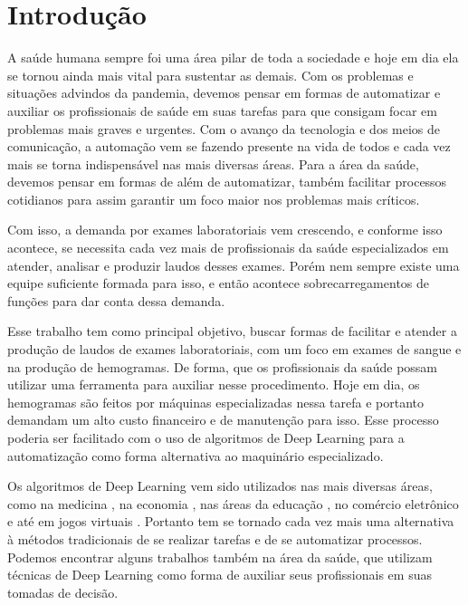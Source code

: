 \chapter{Introdução}
\label{chap:introducao}

A saúde humana sempre foi uma área pilar de toda a sociedade e hoje em dia ela se tornou ainda mais vital para sustentar as demais. Com os problemas e situações advindos da pandemia, devemos pensar em formas de automatizar e auxiliar os profissionais de saúde em suas tarefas para que consigam focar em problemas mais graves e urgentes. Com o avanço da tecnologia e dos meios de comunicação, a automação vem se fazendo presente na vida de todos e cada vez mais se torna indispensável nas mais diversas áreas. Para a área da saúde, devemos pensar em formas de além de automatizar, também facilitar processos cotidianos para assim garantir um foco maior nos problemas mais críticos.

Com isso, a demanda por exames laboratoriais vem crescendo, e conforme isso acontece, se necessita cada vez mais de profissionais da saúde especializados em atender, analisar e produzir laudos desses exames. Porém nem sempre existe uma equipe suficiente formada para isso, e então acontece sobrecarregamentos de funções para dar conta dessa demanda.

Esse trabalho tem como principal objetivo, buscar formas de facilitar e atender a produção de laudos de exames laboratoriais, com um foco em exames de sangue e na produção de hemogramas. De forma, que os profissionais da saúde possam utilizar uma ferramenta para auxiliar nesse procedimento. Hoje em dia, os hemogramas são feitos por máquinas especializadas nessa tarefa e portanto demandam um alto custo financeiro e de manutenção para isso. Esse processo poderia ser facilitado com o uso de algoritmos de Deep Learning para a automatização como forma alternativa ao maquinário especializado.

Os algoritmos de Deep Learning vem sido utilizados nas mais diversas áreas, como na medicina \cite{deepMedicine}, na economia \cite{deepEconomy}, nas áreas da educação \cite{deepEducation}, no comércio eletrônico \cite{deepEcommerce} e até em jogos virtuais \cite{deepGaming}. Portanto tem se tornado cada vez mais uma alternativa à métodos tradicionais de se realizar tarefas e de se automatizar processos. Podemos encontrar alguns trabalhos também na área da saúde, que utilizam técnicas de Deep Learning como forma de auxiliar seus profissionais em suas tomadas de decisão.

